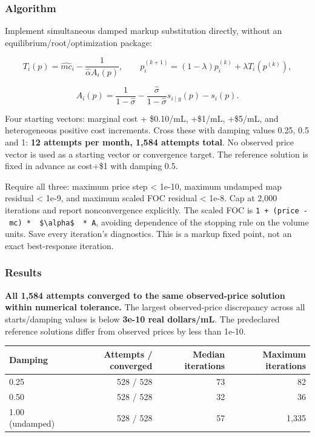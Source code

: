 \documentclass[10pt,]{article}
\begin{document}
\subsubsection{Algorithm}\label{algorithm}

Implement simultaneous damped markup substitution directly, without an
equilibrium/root/optimization package:

\[
T_i(p)=\widehat{mc}_i-\frac{1}{\widehat\alpha  A_i(p)},\qquad
p_i^{(k+1)}=(1-\lambda)p_i^{(k)}+\lambda T_i(p^{(k)}),
\]

\[
A_i(p)=\frac{1}{1-\widehat\sigma}
-\frac{\widehat\sigma}{1-\widehat\sigma}s_{i\mid g}(p)-s_i(p).
\]

Four starting vectors: marginal cost + \$0.10/mL, +\$1/mL, +\$5/mL, and
heterogeneous positive cost increments. Cross these with damping values
0.25, 0.5 and 1: \textbf{12 attempts per month, 1,584 attempts total}.
No observed price vector is used as a starting vector or convergence
target. The reference solution is fixed in advance as cost+\$1 with
damping 0.5.

Require all three: maximum price step \textless{} 1e-10, maximum
undamped map residual \textless{} 1e-9, and maximum scaled FOC residual
\textless{} 1e-8. Cap at 2,000 iterations and report nonconvergence
explicitly. The scaled FOC is
\texttt{1\ +\ (price\ -\ mc)\ *\ \ \$\textbackslash{}alpha\$\ \ *\ A},
avoiding dependence of the stopping rule on the volume units. Save every
iteration's diagnostics. This is a markup fixed point, not an exact
best-response iteration.

\subsubsection{Results}\label{results}

\textbf{All 1,584 attempts converged to the same observed-price solution
within numerical tolerance.} The largest observed-price discrepancy
across all starts/damping values is below \textbf{3e-10 real
dollars/mL}. The predeclared reference solutions differ from observed
prices by less than 1e-10.

\begin{longtable}[]{@{}lrrr@{}}
\toprule
Damping & Attempts / converged & Median iterations & Maximum
iterations\tabularnewline
\midrule
\endhead
0.25 & 528 / 528 & 73 & 82\tabularnewline
0.50 & 528 / 528 & 32 & 36\tabularnewline
1.00 (undamped) & 528 / 528 & 57 & 1,335\tabularnewline
\bottomrule
\end{longtable}
\end{document}

